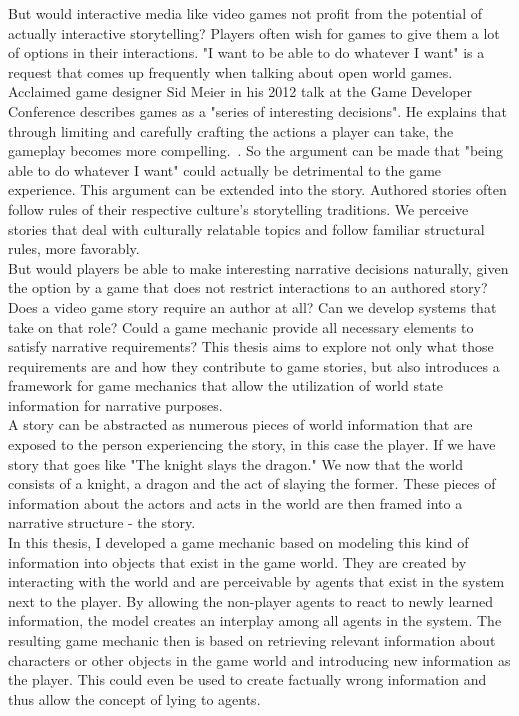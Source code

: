 But would interactive media like video games not profit from the potential of actually interactive storytelling? Players often wish for games to give them a lot of options in their interactions. "I want to be able to do whatever I want" is a request that comes up frequently when talking about open world games. Acclaimed game designer Sid Meier in his 2012 talk at the Game Developer Conference describes games as a "series of interesting decisions". He explains that through limiting and carefully crafting the actions a player can take, the gameplay becomes more compelling.~\cite{Dring2018}. So the argument can be made that "being able to do whatever I want" could actually be detrimental to the game experience. This argument can be extended into the story. Authored stories often follow rules of their respective culture's storytelling traditions. We perceive stories that deal with culturally relatable topics and follow familiar structural rules, more favorably.~\cite{Cooney2017}\\
But would players be able to make interesting narrative decisions naturally, given the option by a game that does not restrict interactions to an authored story? Does a video game story require an author at all? Can we  develop systems that take on that role? Could a game mechanic provide all necessary elements to satisfy narrative requirements? This thesis aims to explore not only what those requirements are and how they contribute to game stories, but also introduces a framework for game mechanics that allow the utilization of world state information for narrative purposes.\\
A story can be abstracted as numerous pieces of world information that are exposed to the person experiencing the story, in this case the player. If we have story that goes like "The knight slays the dragon." We now that the world consists of a knight, a dragon and the act of slaying the former. These pieces of information about the actors and acts in the world are then framed into a narrative structure - the story.\\
In this thesis, I developed a game mechanic based on modeling this kind of information into objects that exist in the game world. They are created by interacting with the world and are perceivable by agents that exist in the system next to the player. By allowing the non-player agents to react to newly learned information, the model creates an interplay among all agents in the system. The resulting game mechanic then is based on retrieving relevant information about characters or other objects in the game world and introducing new information as the player. This could even be used to create factually wrong information and thus allow the concept of lying to agents.\\
